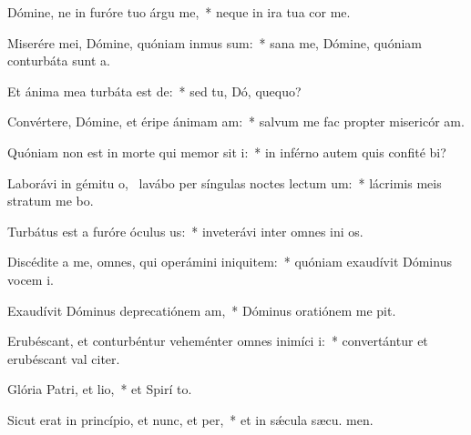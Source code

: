 \item Dómine, ne in furóre tuo árgu me,~* neque in ira tua cor me.
\item Miserére mei, Dómine, quóniam inmus sum:~* sana me, Dómine, quóniam conturbáta sunt  a.
\item Et ánima mea turbáta est de:~* sed tu, Dó, quequo?
\item Convértere, Dómine, et éripe ánimam am:~* salvum me fac propter misericór am.
\item Quóniam non est in morte qui memor sit i:~* in inférno autem quis confité bi?
\item Laborávi in gémitu o,~\pscross{} lavábo per síngulas noctes lectum um:~* lácrimis meis stratum me bo.
\item Turbátus est a furóre óculus us:~* inveterávi inter omnes ini os.
\item Discédite a me, omnes, qui operámini iniquitem:~* quóniam exaudívit Dóminus vocem  i.
\item Exaudívit Dóminus deprecatiónem am,~* Dóminus oratiónem me pit.
\item Erubéscant, et conturbéntur veheménter omnes inimíci i:~* convertántur et erubéscant val citer.
\item Glória Patri, et lio,~* et Spirí to.
\item Sicut erat in princípio, et nunc, et per,~* et in sǽcula sæcu. men.
